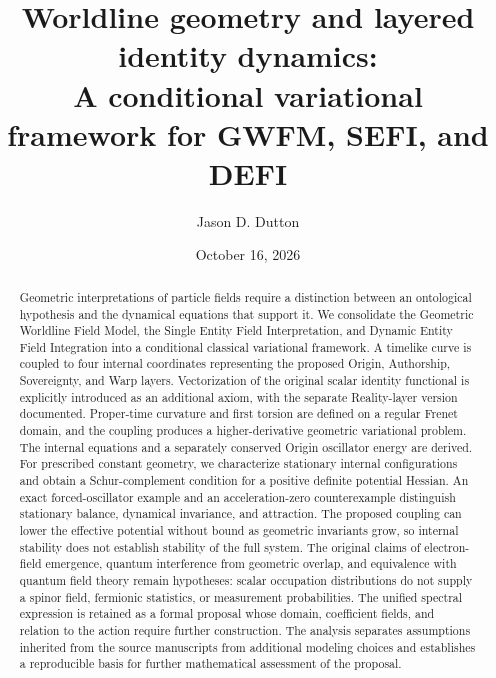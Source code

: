 \documentclass[aip,jmp,reprint,onecolumn,amsmath,amssymb]{revtex4-2}
\begin{document}
\title{Worldline geometry and layered identity dynamics:\\A conditional variational framework for GWFM, SEFI, and DEFI}
\author{Jason D. Dutton}
\date{October 16, 2026}
\begin{abstract}
Geometric interpretations of particle fields require a distinction between an ontological hypothesis and the dynamical equations that support it. We consolidate the Geometric Worldline Field Model, the Single Entity Field Interpretation, and Dynamic Entity Field Integration into a conditional classical variational framework. A timelike curve is coupled to four internal coordinates representing the proposed Origin, Authorship, Sovereignty, and Warp layers. Vectorization of the original scalar identity functional is explicitly introduced as an additional axiom, with the separate Reality-layer version documented. Proper-time curvature and first torsion are defined on a regular Frenet domain, and the coupling produces a higher-derivative geometric variational problem. The internal equations and a separately conserved Origin oscillator energy are derived. For prescribed constant geometry, we characterize stationary internal configurations and obtain a Schur-complement condition for a positive definite potential Hessian. An exact forced-oscillator example and an acceleration-zero counterexample distinguish stationary balance, dynamical invariance, and attraction. The proposed coupling can lower the effective potential without bound as geometric invariants grow, so internal stability does not establish stability of the full system. The original claims of electron-field emergence, quantum interference from geometric overlap, and equivalence with quantum field theory remain hypotheses: scalar occupation distributions do not supply a spinor field, fermionic statistics, or measurement probabilities. The unified spectral expression is retained as a formal proposal whose domain, coefficient fields, and relation to the action require further construction. The analysis separates assumptions inherited from the source manuscripts from additional modeling choices and establishes a reproducible basis for further mathematical assessment of the proposal.
\end{abstract}
\maketitle
\end{document}

